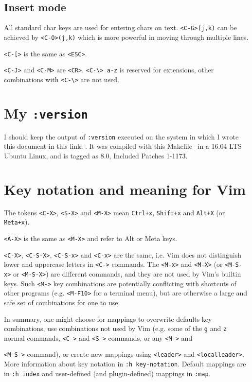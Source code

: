 \documentclass{article}
\newcommand{\ttt}[1] {
	\texttt{<#1>}}
\newcommand{\tttt}[1]{\texttt{#1}}
\begin{document}
\subsection{Insert mode}
All standard char keys are used for entering chars on text.
\tttt{<C-G>(j,k)} can be achieved by \tttt{<C-O>(j,k)} which is more powerful
in moving through multiple lines.
\ttt{C-[} is the same as \ttt{ESC}.
\ttt{C-J} and \ttt{C-M} are \ttt{CR}.
\tttt{<C-\textbackslash> a-z} is reserved for extensions,
other combinations with \ttt{C-\textbackslash} are not used.

\section{My \tttt{:version}}
I should keep the output of \tttt{:version} executed on the system
in which I wrote this document in this link:
\url{}.
It was compiled with this Makefile~\cite{makefile}
in a 16.04 LTS Ubuntu Linux,
and is tagged as 8.0, Included Patches 1-1173.

\section{Key notation and meaning for Vim}
The tokens \ttt{C-X}, \ttt{S-X} and \ttt{M-X}
mean \tttt{Ctrl+x}, \tttt{Shift+x} and \tttt{Alt+X}
(or \tttt{Meta+x}).
\ttt{A-X} is the same as \ttt{M-X} and refer to
Alt or Meta keys.
\ttt{C-X}, \ttt{C-S-X}, \ttt{C-S-x}  and \ttt{C-x} are the same,
i.e. Vim does not distinguish lower and uppercase 
letters in \ttt{C-} commands.
The \ttt{M-x} and \ttt{M-X} (or \ttt{M-S-x} or \ttt{M-S-X})
are different commands,
and they are not used by Vim's builtin keys.
Such \ttt{M-} key combinations are potentially conflicting
with shortcuts of other programs (e.g. \ttt{M-F10} for a terminal menu),
but are otherwise a large and safe set of combinations
for one to use.

In summary,
one might choose for mappings to overwrite defaults key combinations,
use combinations not used by Vim (e.g. some of the \tttt{g} and \tttt{z}
normal commands, \ttt{C-} and \ttt{S-} commands, or any \ttt{M-} and
\ttt{M-S-} command), or
create new mappings using \tttt{<leader>} and \tttt{<localleader>}.
More information about key notation in \tttt{:h key-notation}.
Default mappings are in \tttt{:h index} and user-defined (and plugin-defined) mappings
in \tttt{:map}.
\end{document}
